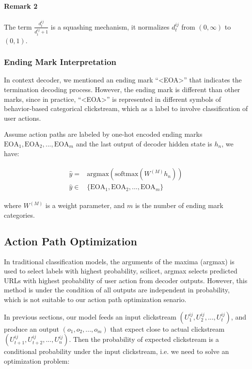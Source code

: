 \paragraph{Remark 2} The term $\frac{d^{ij}_t}{d^{ij}_t + 1}$ is a squashing mechanism,
it normalizes $d^{ij}_t$ from $(0, \infty)$ to $(0, 1)$.

\subsubsection{Ending Mark Interpretation}
\label{sec:mark-interpretation}

In context decoder, we mentioned an ending mark ``<EOA>'' that indicates the termination 
decoding process. However, the ending mark is different than other marks, since in practice,
``<EOA>'' is represented in different symbols of behavior-based categorical clickstream, which as a label to
involve classification of user actions.

Assume action paths are labeled by one-hot encoded ending marks 
$\text{EOA}_1, \text{EOA}_2, ..., \text{EOA}_m$ and the last output
of decoder hidden state is $h_n$, we have:

\begin{align}
\label{eqn:mark}
\begin{split}
    \hat{y} =& \text{argmax} (\text{softmax} (W^{(M)} h_n)) \\
    \hat{y} \in& \{ \text{EOA}_1, \text{EOA}_2, ..., \text{EOA}_m \}
\end{split}
\end{align}

where $W^{(M)}$ is a weight parameter, and $m$ is the number of ending mark categories.

\subsection{Action Path Optimization}
\label{sec:optimization}

In traditional classification models, the arguments of the maxima (argmax) is used to select
labels with highest probability, scilicet, argmax selects predicted URLs with highest probability
of user action from decoder outputs. However, this method is under the condition of all outputs
are independent in probability, which is not suitable to our action path optimization senario.

In previous sections, our model feeds an input clickstream $(U^{ij}_1, U^{ij}_2, ..., U^{ij}_t)$,
and produce an output $(o_1, o_2, ..., o_{m})$ that expect close to actual clickstream 
$(U^{ij}_{t+1}, U^{ij}_{t+2}, ..., U^{ij}_n)$.
Then the probability of expected clickstream is a conditional probability under 
the input clickstream, i.e. we need to solve an optimization problem:


